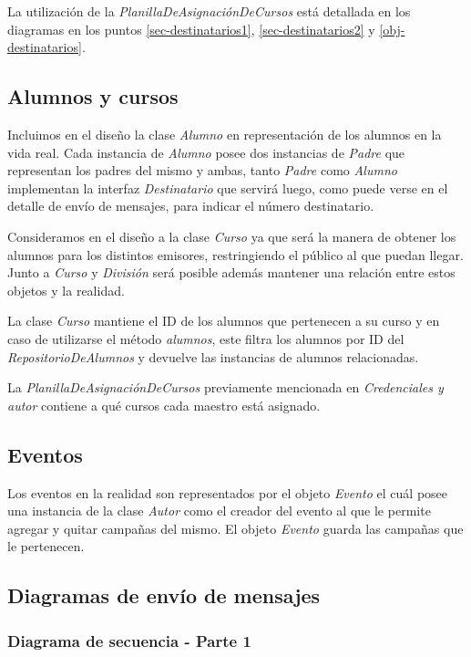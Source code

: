 \documentclass[a4paper, 10pt, twoside]{article}
\begin{document}
La utilización de la \textit{PlanillaDeAsignaciónDeCursos} está detallada en los diagramas en los puntos 
\ref{sec-destinatarios1}, \ref{sec-destinatarios2} y \ref{obj-destinatarios}.


\subsection{Alumnos y cursos}
Incluimos en el diseño la clase \textit{Alumno} en representación de los alumnos en la vida real. Cada instancia de 
\textit{Alumno} posee dos instancias de \textit{Padre} que representan los padres del mismo y ambas, tanto 
\textit{Padre} como \textit{Alumno} implementan la interfaz \textit{Destinatario} que servirá luego, como puede 
verse en el detalle de envío de mensajes, para indicar el número destinatario.

Consideramos en el diseño a la clase \textit{Curso} ya que será la manera de obtener los alumnos para los distintos 
emisores, restringiendo el público al que puedan llegar. Junto a \textit{Curso} y \textit{División} será posible 
además mantener una relación entre estos objetos y la realidad.

La clase \textit{Curso} mantiene el ID de los alumnos que pertenecen a su curso y en caso de 
utilizarse el método \textit{alumnos}, este filtra los alumnos por ID del \textit{RepositorioDeAlumnos} y 
devuelve las instancias de alumnos relacionadas.

La \textit{PlanillaDeAsignaciónDeCursos} previamente mencionada en \textit{Credenciales y autor} contiene a qué 
cursos cada maestro está asignado.

\subsection{Eventos}
Los eventos en la realidad son representados por el objeto \textit{Evento} el cuál posee una instancia de la clase 
\textit{Autor} como el creador del evento al que le permite agregar y quitar campañas del mismo. El objeto 
\textit{Evento} guarda las campañas que le pertenecen.

\subsection{Diagramas de envío de mensajes}

\subsubsection{Diagrama de secuencia - Parte 1}
\label{sec-envio1}
\end{document}
